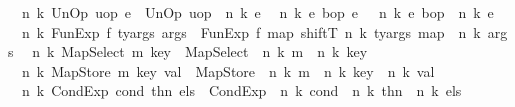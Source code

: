 \begin{isabellebody}
{\isacharbar}{\kern0pt}\ {\isachardoublequoteopen}{\isasymup}\isactrlsub {\isasymtau}\ n\ k\ {\isacharparenleft}{\kern0pt}UnOp\ uop\ e{\isacharparenright}{\kern0pt}\ {\isacharequal}{\kern0pt}\ UnOp\ uop\ {\isacharparenleft}{\kern0pt}{\isasymup}\isactrlsub {\isasymtau}\ n\ k\ e{\isacharparenright}{\kern0pt}{\isachardoublequoteclose}\isanewline
{\isacharbar}{\kern0pt}\ {\isachardoublequoteopen}{\isasymup}\isactrlsub {\isasymtau}\ n\ k\ {\isacharparenleft}{\kern0pt}e{}\ {\isasymguillemotleft}bop{\isasymguillemotright}\ e{}{\isacharparenright}{\kern0pt}\ {\isacharequal}{\kern0pt}\ {\isacharparenleft}{\kern0pt}{\isasymup}\isactrlsub {\isasymtau}\ n\ k\ e{}{\isacharparenright}{\kern0pt}\ {\isasymguillemotleft}bop{\isasymguillemotright}\ {\isacharparenleft}{\kern0pt}{\isasymup}\isactrlsub {\isasymtau}\ n\ k\ e{}{\isacharparenright}{\kern0pt}{\isachardoublequoteclose}\isanewline
{\isacharbar}{\kern0pt}\ {\isachardoublequoteopen}{\isasymup}\isactrlsub {\isasymtau}\ n\ k\ {\isacharparenleft}{\kern0pt}FunExp\ f\ ty{\isacharunderscore}{\kern0pt}args\ args{\isacharparenright}{\kern0pt}\ {\isacharequal}{\kern0pt}\ FunExp\ f\ {\isacharparenleft}{\kern0pt}map\ {\isacharparenleft}{\kern0pt}shiftT\ n\ k{\isacharparenright}{\kern0pt}\ ty{\isacharunderscore}{\kern0pt}args{\isacharparenright}{\kern0pt}\ {\isacharparenleft}{\kern0pt}map\ {\isacharparenleft}{\kern0pt}{\isasymup}\isactrlsub {\isasymtau}\ n\ k{\isacharparenright}{\kern0pt}\ args{\isacharparenright}{\kern0pt}{\isachardoublequoteclose}\isanewline
{\isacharbar}{\kern0pt}\ {\isachardoublequoteopen}{\isasymup}\isactrlsub {\isasymtau}\ n\ k\ {\isacharparenleft}{\kern0pt}MapSelect\ m\ key{\isacharparenright}{\kern0pt}\ {\isacharequal}{\kern0pt}\ MapSelect\ {\isacharparenleft}{\kern0pt}{\isasymup}\isactrlsub {\isasymtau}\ n\ k\ m{\isacharparenright}{\kern0pt}\ {\isacharparenleft}{\kern0pt}{\isasymup}\isactrlsub {\isasymtau}\ n\ k\ key{\isacharparenright}{\kern0pt}{\isachardoublequoteclose}\isanewline
{\isacharbar}{\kern0pt}\ {\isachardoublequoteopen}{\isasymup}\isactrlsub {\isasymtau}\ n\ k\ {\isacharparenleft}{\kern0pt}MapStore\ m\ key\ val{\isacharparenright}{\kern0pt}\ {\isacharequal}{\kern0pt}\ MapStore\ {\isacharparenleft}{\kern0pt}{\isasymup}\isactrlsub {\isasymtau}\ n\ k\ m{\isacharparenright}{\kern0pt}\ {\isacharparenleft}{\kern0pt}{\isasymup}\isactrlsub {\isasymtau}\ n\ k\ key{\isacharparenright}{\kern0pt}\ {\isacharparenleft}{\kern0pt}{\isasymup}\isactrlsub {\isasymtau}\ n\ k\ val{\isacharparenright}{\kern0pt}{\isachardoublequoteclose}\isanewline
{\isacharbar}{\kern0pt}\ {\isachardoublequoteopen}{\isasymup}\isactrlsub {\isasymtau}\ n\ k\ {\isacharparenleft}{\kern0pt}CondExp\ cond\ thn\ els{\isacharparenright}{\kern0pt}\ {\isacharequal}{\kern0pt}\ CondExp\ {\isacharparenleft}{\kern0pt}{\isasymup}\isactrlsub {\isasymtau}\ n\ k\ cond{\isacharparenright}{\kern0pt}\ {\isacharparenleft}{\kern0pt}{\isasymup}\isactrlsub {\isasymtau}\ n\ k\ thn{\isacharparenright}{\kern0pt}\ {\isacharparenleft}{\kern0pt}{\isasymup}\isactrlsub {\isasymtau}\ n\ k\ els{\isacharparenright}{\kern0pt}{\isachardoublequoteclose}\isanewline

\end{isabellebody}
